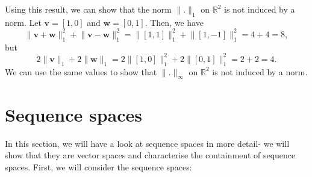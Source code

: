\documentclass[a4paper, openany]{memoir}
\theoremstyle{definition}
\theoremstyle{plain}
\begin{document}
Using this result, we can show that the norm $\lVert . \rVert_1$ on $\mathbb{R}^2$ is not induced by a norm. Let $\bm{v} = [1, 0]$ and $\bm{w} = [0, 1]$. Then, we have
\[\lVert \bm{v} + \bm{w} \rVert_1^2 + \lVert \bm{v} - \bm{w} \rVert_1^2 = \lVert [1, 1] \rVert_1^2 + \lVert [1, -1] \rVert_1^2 = 4 + 4 = 8,\]
but
\[2\lVert \bm{v} \rVert_1 + 2\lVert \bm{w} \rVert_1 = 2\lVert [1, 0] \rVert_1^2 + 2\lVert [0, 1] \rVert_1^2 = 2 + 2 = 4.\]
We can use the same values to show that $\lVert . \rVert_\infty$ on $\mathbb{R}^2$ is not induced by a norm.

\newpage

\section{Sequence spaces}
In this section, we will have a look at sequence spaces in more detail- we will show that they are vector spaces and characterise the containment of sequence spaces. First, we will consider the sequence spaces:
\end{document}
